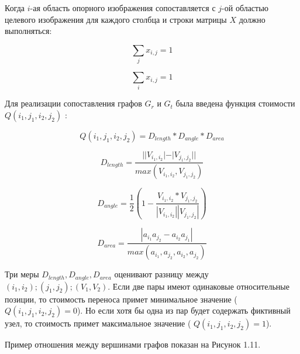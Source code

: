 Когда $i$-ая область опорного изображения сопоставляется с $j$-ой областью целевого изображения для каждого столбца и строки матрицы $X$ должно выполняться:


\begin{equation}
\sum_{j} x_{i,j} = 1
\end{equation}

\begin{equation}
\sum_{i} x_{i,j} = 1
\end{equation}

Для реализации сопоставления графов $G_r$ и $G_t$ была введена функция стоимости $Q(i_1, j_1, i_2, j_2)$ :


\begin{equation}
Q(i_1, j_1, i_2, j_2) = D_{length} * D_{angle} * D_{area}
\end{equation}

\begin{equation}
D_{length} = \frac{||V_{i_1, i_2}| - |V_{j_1, j_2}||}{max(V_{i_1, i_2}, V_{j_1, j_2})}
\end{equation}

\begin{equation}
D_{angle} = \frac{1}{2} (1 - \frac{V_{i_1, i_2}*V_{j_1, j_2}}{|V_{i_1, i_2}||V_{j_1, j_2}|})
\end{equation}

\begin{equation}
D_{area} = \frac{|a_{i_1}a_{j_2} - a_{i_2}a_{j_1}|}{max(a_{i_1}, a_{j_2}, a_{i_2}, a_{j_2})}
\end{equation}



Три меры $ D_{length}, D_{angle}, D_{area} $ оценивают разницу между $(i_1, i_2); (j_1, j_2); (V_1, V_2)$. Если две пары имеют одинаковые относительные позиции, то стоимость переноса примет минимальное значение ( $Q(i_1, j_1, i_2, j_2) = 0$). Но если хотя бы одна из пар будет содержать фиктивный узел, то стоимость примет максимальное значение ( $Q(i_1, j_1, i_2, j_2) = 1$). 


Пример отношения между вершинами графов показан на Рисунок 1.11. 

\begin{figure}[ht!]
\end{figure}




